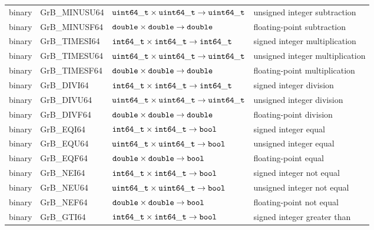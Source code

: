 \begin{table}
\begin{center}
\begin{tabular}{l|l|l|l}
binary   & {\sf GrB\_MINUSU64} & ${\tt uint64\_t} \times {\tt uint64\_t} \rightarrow {\tt uint64\_t}$ & unsigned integer subtraction \\
binary   & {\sf GrB\_MINUSF64} & ${\tt double} \times {\tt double} \rightarrow {\tt double}$          & floating-point subtraction \\
binary   & {\sf GrB\_TIMESI64} & ${\tt int64\_t} \times {\tt int64\_t} \rightarrow {\tt int64\_t}$    & signed integer multiplication \\
binary   & {\sf GrB\_TIMESU64} & ${\tt uint64\_t} \times {\tt uint64\_t} \rightarrow {\tt uint64\_t}$ & unsigned integer multiplication \\
binary   & {\sf GrB\_TIMESF64} & ${\tt double} \times {\tt double} \rightarrow {\tt double}$          & floating-point multiplication \\
binary   & {\sf GrB\_DIVI64}   & ${\tt int64\_t} \times {\tt int64\_t} \rightarrow {\tt int64\_t}$    & signed integer division \\
binary   & {\sf GrB\_DIVU64}   & ${\tt uint64\_t} \times {\tt uint64\_t} \rightarrow {\tt uint64\_t}$ & unsigned integer division \\
binary   & {\sf GrB\_DIVF64}   & ${\tt double} \times {\tt double} \rightarrow {\tt double}$          & floating-point division \\
binary   & {\sf GrB\_EQI64}    & ${\tt int64\_t} \times {\tt int64\_t} \rightarrow {\tt bool}$        & signed integer  equal \\
binary   & {\sf GrB\_EQU64}    & ${\tt uint64\_t} \times {\tt uint64\_t} \rightarrow {\tt bool}$      & unsigned integer  equal \\
binary   & {\sf GrB\_EQF64}    & ${\tt double} \times {\tt double} \rightarrow {\tt bool}$            & floating-point  equal \\
binary   & {\sf GrB\_NEI64}    & ${\tt int64\_t} \times {\tt int64\_t} \rightarrow {\tt bool}$        & signed integer not equal \\
binary   & {\sf GrB\_NEU64}    & ${\tt uint64\_t} \times {\tt uint64\_t} \rightarrow {\tt bool}$      & unsigned integer not equal \\
binary   & {\sf GrB\_NEF64}    & ${\tt double} \times {\tt double} \rightarrow {\tt bool}$            & floating-point not equal \\
binary   & {\sf GrB\_GTI64}    & ${\tt int64\_t} \times {\tt int64\_t} \rightarrow {\tt bool}$        & signed integer greater than  \\

\end{tabular}
\end{center}
\end{table}
